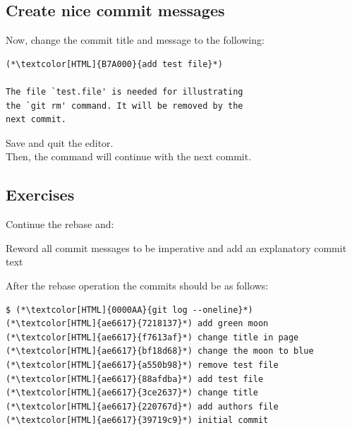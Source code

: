 \subsection{Create nice commit messages}
\begin{frame}[fragile]
  \subslidetitle

  Now, change the commit title and message to the following:\\
  \begin{lstlisting}
(*\textcolor[HTML]{B7A000}{add test file}*)

The file `test.file' is needed for illustrating
the `git rm' command. It will be removed by the
next commit.
\end{lstlisting}

  \vspace{1em}
  Save and quit the editor.
  \\

  \vspace{1em}
  Then, the  command will continue with the next commit.
\end{frame}

\subsection{Exercises}
\begin{frame}[fragile]
  \subslidetitle
  Continue the rebase and:
  \begin{exercise}
    \item Reword all commit messages to be imperative and add an explanatory commit text
  \end{exercise}

  \vspace{1em}
  After the rebase operation the commits should be as follows:
  \begin{lstlisting}
$ (*\textcolor[HTML]{0000AA}{git log --oneline}*)
(*\textcolor[HTML]{ae6617}{7218137}*) add green moon
(*\textcolor[HTML]{ae6617}{f7613af}*) change title in page
(*\textcolor[HTML]{ae6617}{bf18d68}*) change the moon to blue
(*\textcolor[HTML]{ae6617}{a550b98}*) remove test file
(*\textcolor[HTML]{ae6617}{88afdba}*) add test file
(*\textcolor[HTML]{ae6617}{3ce2637}*) change title
(*\textcolor[HTML]{ae6617}{220767d}*) add authors file
(*\textcolor[HTML]{ae6617}{39719c9}*) initial commit
\end{lstlisting}
\end{frame}


